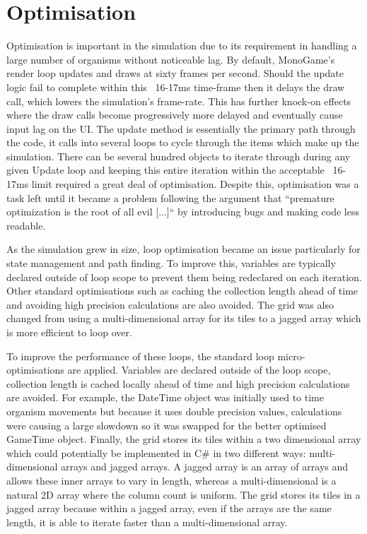 \documentclass[a4paper, oneside, 11pt]{report}
\begin{document}
\section{Optimisation}\label{optim}
Optimisation is important in the simulation due to its requirement in handling a large number of organisms without noticeable lag. By default, MonoGame's render loop updates and draws at sixty frames per second. Should the update logic fail to complete within this ~16-17ms time-frame then it delays the draw call, which lowers the simulation's frame-rate. This has further knock-on effects where the draw calls become progressively more delayed and eventually cause input lag on the UI. The update method is essentially the primary path through the code, it calls into several loops to cycle through the items which make up the simulation. There can be several hundred objects to iterate through during any given Update loop and keeping this entire iteration within the acceptable ~16-17ms limit required a great deal of optimisation. Despite this, optimisation was a task left until it became a problem following the argument that ``premature optimization is the root of all evil [...]`` \cite{knuth} by introducing bugs and making code less readable. 

As the simulation grew in size, loop optimisation became an issue particularly for state management and path finding. To improve this, variables are typically declared outside of loop scope to prevent them being redeclared on each iteration. Other standard optimisations such as caching the collection length ahead of time and avoiding high precision calculations are also avoided. The grid was also changed from using a multi-dimensional array for its tiles to a jagged array which is more efficient to loop over.


To improve the performance of these loops, the standard loop micro-optimisations are applied. Variables are declared outside of the loop scope, collection length is cached locally ahead of time and high precision calculations are avoided. For example, the DateTime object was initially used to time organism movements but because it uses double precision values, calculations were causing a large slowdown so it was swapped for the better optimised GameTime object. Finally, the grid stores its tiles within a two dimensional array which could potentially be implemented in C\# in two different ways: multi-dimensional arrays and jagged arrays. A jagged array is an array of arrays and allows these inner arrays to vary in length, whereas a multi-dimensional is a natural 2D array where the column count is uniform. The grid stores its tiles in a jagged array because within a jagged array, even if the arrays are the same length, it is able to iterate faster than a multi-dimensional array.
\end{document}
